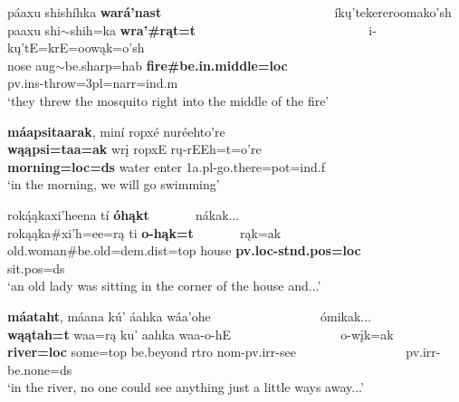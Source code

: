 \begin{exe}
\begin{xlist}
\item\label{ExamplesOfTaa5} \glll páaxu shishíhka \textbf{wará'nast}  ~ ~ ~ ~ ~ ~ ~ ~ ~ ~ ~ ~ ~ ~ ~ ~ íkų'tekereroomako'sh\\
    paaxu shi$\sim$shih=ka \textbf{wra'\#rąt=t}  ~ ~ ~ ~ ~ ~ ~ ~ ~ ~ ~ ~ ~ ~ ~ ~ i-kų'tE=krE=oowąk=o'sh\\
    \textnormal{nose} aug$\sim$\textnormal{be.sharp}=hab \textbf{\textnormal{\bfseries fire}\#\textnormal{\bfseries be.in.middle}=loc} ~ ~ ~ ~ ~ ~ ~ ~ ~ ~ ~ ~ ~ ~ ~ ~ pv.ins-\textnormal{throw}=3pl=narr=ind.m\\
    \glt `they threw the mosquito right into the middle of the fire' \citep[153]{hollow1973b}

\item\label{ExamplesOfTaa6} \glll \textbf{máapsitaarak}, miní ropxé nuréehto're\\
    \textbf{wąąpsi=taa=ak} wrį ropxE rų-rEEh=t=o're\\
    \textbf{\textnormal{\bfseries morning}=loc=ds} \textnormal{water} \textnormal{enter} 1a.pl-\textnormal{go.there}=pot=ind.f\\
    \glt `in the morning, we will go swimming' \citep[105]{hollow1973b}
    
\item\label{ExamplesOfTaa7} \glll roką́ąkaxi'heena tí \textbf{óhąkt} ~ ~ ~ ~ nákak...\\
    rokąąka\#xi'h=ee=rą ti \textbf{o-hąk=t} ~ ~ ~ ~  rąk=ak\\
    \textnormal{old.woman}\#\textnormal{be.old}=dem.dist=top \textnormal{house} \textbf{pv.loc-stnd.pos=loc} ~ ~ ~ ~  sit.pos=ds\\
    \glt `an old lady was sitting in the corner of the house and...' \citep[151]{hollow1973b}
    
\item\label{ExamplesOfTaa8} \glll \textbf{máataht}, máana kú' áahka wáa'ohe ~ ~ ~ ~ ~ ~ ~ ~ ~ ~ ómikak...\\
    \textbf{wąątah=t} waa=rą ku' aahka waa-o-hE ~ ~ ~ ~ ~ ~ ~ ~ ~ ~   o-wįk=ak\\
    \textbf{\textnormal{\bfseries river}=loc} \textnormal{some}=top \textnormal{be.beyond} rtro nom-pv.irr-\textnormal{see} ~ ~ ~ ~ ~ ~ ~ ~ ~ ~ pv.irr-\textnormal{be.none}=ds\\
    \glt `in the river, no one could see anything just a little ways away...' \citep[214]{hollow1973a}
    
\end{xlist}

\end{exe}

